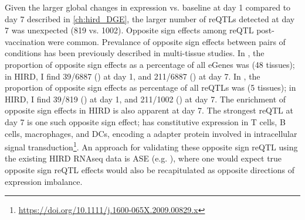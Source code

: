 
Given the larger global changes in expression vs. baseline at day 1 compared to day 7 described in \autoref{ch:hird_DGE}, 
the larger number of \glspl{reQTL} detected at day 7 was unexpected (819 vs. 1002).
Opposite sign effects among \gls{reQTL} post-vaccination were common.
Prevalance of opposite sign effects between pairs of conditions has been previously described in multi-tissue studies.
In \autocite{mizuno2019BiologicalCharacterizationExpression}, the proportion of opposite sign effects as a percentage of all eGenes was  (48 tissues);
in \gls{HIRD}, I find
39/6887 () at day 1,
and 211/6887 () at day 7.
In \autocite{fu2012UnravelingRegulatoryMechanisms}, the proportion of opposite sign effects as percentage of all reQTLs was  (5 tissues);
in \gls{HIRD}, I find
39/819 () at day 1,
and 211/1002 () at day 7.
The enrichment of opposite sign effects in \gls{HIRD} is also apparent at day 7.
The strongest reQTL at day 7 is one such opposite sign effect;
 has constitutive expression in T cells, B cells, macrophages, and \glspl{DC}, 
encoding a adapter protein involved in intracellular signal transduction\footnote{\url{https://doi.org/10.1111/j.1600-065X.2009.00829.x}}.
An approach for validating these opposite sign \gls{reQTL} using the existing \gls{HIRD} \gls{RNAseq} data is \gls{ASE} (e.g. \autocite{kumasaka2016FinemappingCellularQTLs}),
where one would expect true opposite sign \gls{reQTL} effects would also be recapitulated as opposite directions of expression imbalance.

